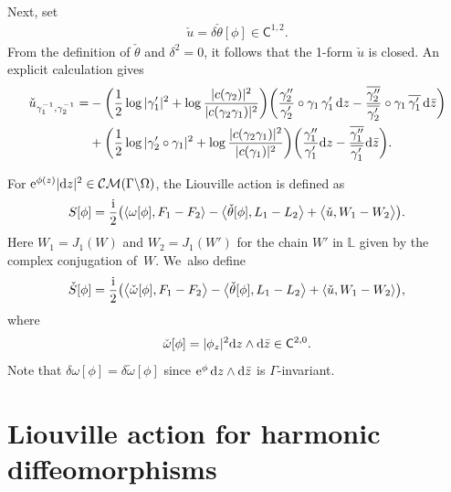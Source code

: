 \documentclass[pdftex]{sigma}%
\numberwithin{equation}{section}
\newcommand{\ov}{\overline}
\begin{document}
Next, set
\begin{gather*}
\check{u}=\delta \check{\theta}[\phi] \in \mathsf{C}^{1,2}.
\end{gather*}
From the definition of $\check{\theta}$ and $\delta^2=0$, it follows that the
1-form $\check{u}$ is closed. An explicit calculation gives
\begin{align*} \check{u}_{\gamma_1^{-1},\gamma_2^{-1}}= & -\bigg(\frac{1}{2}\log|\gamma_1'|^2+\log\frac{|c(\gamma_2)|^2}{|c(\gamma_2\gamma_1)|^2}\bigg)
\bigg(\frac{\gamma_2''}{\gamma_2'}\circ\gamma_1\, \gamma_1'\, {\rm d}z -
\frac{\ov{\gamma_2''}}{\ov{\gamma_2'}}\circ\gamma_1\, \ov{\gamma_1'}\,{\rm d}\bar{z}\bigg)
\\
 & + \bigg(\frac{1}{2}\log|\gamma_2'\circ\gamma_1|^2+\log\frac{|c(\gamma_2\gamma_1)|^2}{|c(\gamma_1)|^2}\bigg) \bigg(\frac{\gamma_1''}{\gamma_1'} {\rm d}z -
\frac{\ov{\gamma_1''}}{\ov{\gamma_1'}}{\rm d}\bar{z}\bigg).
\end{align*}

For ${\rm e}^{\phi(z)}|{\rm d}z|^2\in \mathcal{CM}(\Gamma\backslash \Omega)$, the Liouville action is defined as
\begin{gather*}%
S[\phi]=\frac{\rm i}{2}\bigl(\langle \omega[\phi], F_1-F_2 \rangle-\big\langle\check{\theta}[\phi], L_1-L_2\big\rangle+\big\langle \check{u}, W_1-W_2\big\rangle\bigr).
\end{gather*}
Here $W_1=J_1(W)$ and $W_2=J_1(W')$ for the chain $W'$ in $\mathbb{L}$ given by the complex conjugation of~$W$. We~also define
\begin{gather}\label{e:def-check-S}
\check{S}[\phi]=\frac{\rm i}{2}\bigl(\big\langle \check{\omega}[\phi], F_1-F_2\big\rangle-\big\langle\check{\theta}[\phi], L_1-L_2\big\rangle+\langle \check{u}, W_1-W_2\rangle\bigr),
\end{gather}
where
\begin{gather*}
\check{\omega}[\phi] = |\phi_{z}|^2 {\rm d}z\wedge {\rm d}\bar{z}\in \mathsf{C}^{2,0}.
\end{gather*}
Note that $\delta \omega[\phi] =\delta \check{\omega}[\phi]$ since ${\rm e}^\phi \,{\rm d}z\wedge {\rm d}\bar{z}$ is $\Gamma$-invariant.

\section{Liouville action for harmonic diffeomorphisms}\label{s:harmonic}
\end{document}
